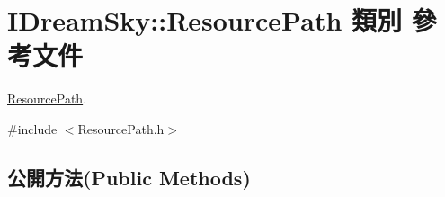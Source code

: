 \hypertarget{class_i_dream_sky_1_1_resource_path}{}\section{I\+Dream\+Sky\+:\+:Resource\+Path 類別 參考文件}
\label{class_i_dream_sky_1_1_resource_path}


\hyperlink{class_i_dream_sky_1_1_resource_path}{Resource\+Path}.  




{\ttfamily \#include $<$Resource\+Path.\+h$>$}

\subsection*{公開方法(Public Methods)}
